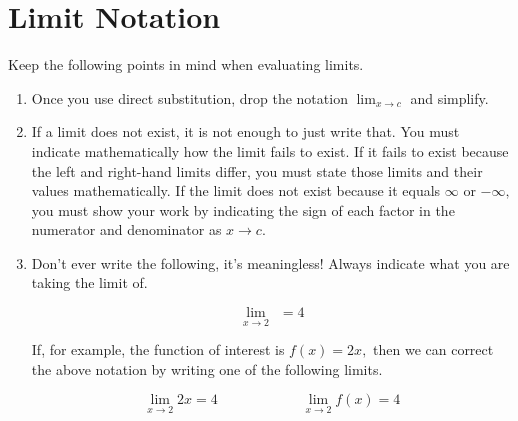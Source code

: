 \documentclass{ximera}
\begin{document}
\begin{center}
\end{center}



\section*{Limit Notation}

Keep the following points in mind when evaluating limits.

\begin{enumerate}
\item[i.]  Once you use direct substitution, drop the notation
$\displaystyle \lim_{x \rightarrow c}$ and simplify.

\item[ii.]  If a limit does not exist, it is not
enough to just write that.  You must indicate mathematically
how the limit fails to exist.  If it fails to exist because the
left and right-hand limits differ, you must state those limits and
their values mathematically.  If the limit
does not exist because it equals $\infty$ or $-\infty,$ you must show your
work by indicating the sign of each factor in the numerator and
denominator as $x \rightarrow c.$

\item[iii.]  Don't ever write the following, it's meaningless!  Always indicate what you are taking
the limit of.

\[ \lim_{x \rightarrow 2} \ \ = 4 \]


If, for example, the function of interest is $f(x) = 2x,$ then we can correct the above notation by writing one of the following limits.

\[ \lim_{x \rightarrow 2} 2x  = 4 \hspace{1in}  \lim_{x \rightarrow 2} f(x) = 4 \]

\end{enumerate}
\end{document}
